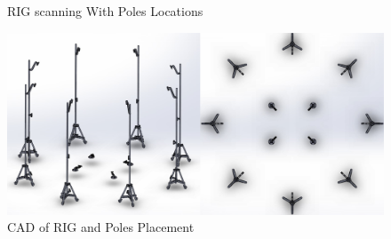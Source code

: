 \documentclass[12pt]{report}
\begin{document}
\begin{figure}[H]
  \centering
  \qquad
  \caption{RIG scanning With Poles Locations}
  \label{fig:RIG}
\end{figure}


\begin{figure}[H]%
  \centering
  \includegraphics[width=1\textwidth]{cad.png}
 \caption{CAD of RIG and Poles Placement}
 \label{fig:cad} 
\end{figure}
\end{document}
